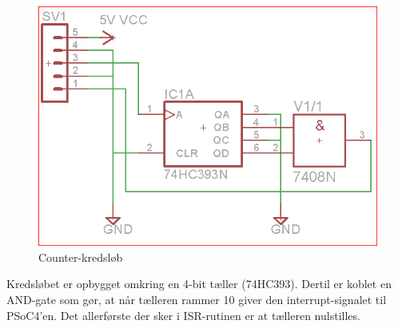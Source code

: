 \begin{figure}[H]
	\centering
	\includegraphics[scale=0.25]{../Hardware/Flow_Sensor/Screenshots/FlowSensor_Schematics_ver1}
	\caption{Counter-kredsløb}
	\label{screenshot:counter}
\end{figure}

Kredsløbet er opbygget omkring en 4-bit tæller (74HC393). Dertil er koblet en AND-gate  som gør, at når tælleren rammer 10 giver den interrupt-signalet til PSoC4'en. Det allerførste der sker i ISR-rutinen er at tælleren nulstilles.

